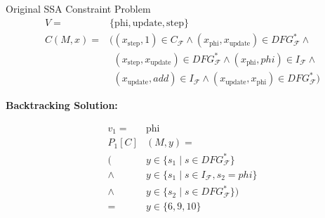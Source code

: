 \centering
\begin{blackwhitebox}{Original SSA Constraint Problem}
    \setlength{\abovedisplayskip}{0pt}
    \setlength{\belowdisplayskip}{0pt}
    \vspace{-0.5em}
    \begin{align*}
        V={}&\{\text{phi}, \text{update}, \text{step}\}\\
        C(M,x)={}&    ((x_\text{step},1)
                        \in C_\mathcal{F}\mathrel\land
                       (x_\text{phi},x_\text{update})
                        \in DFG_\mathcal{F}^*\mathrel\land\\
           &\phantom{(}(x_\text{step},x_\text{update})
                        \in DFG_\mathcal{F}^* \mathrel\land
                       (x_\text{phi}, phi)
                        \in I_\mathcal{F}\mathrel\land\\
           &\phantom{(}(x_\text{update}, add)
                        \in I_\mathcal{F}\mathrel\land
                       (x_\text{update},x_\text{phi})
                        \in DFG_\mathcal{F}^*)
    \end{align*}
\end{blackwhitebox}

\vspace{0.25cm}
{\Large\bf Backtracking Solution:}
\vspace{0.2cm}

\begin{minipage}{6cm}
    \begin{graybox}
        \footnotesize
        \setlength{\abovedisplayskip}{0pt}
        \setlength{\belowdisplayskip}{0pt}
        \vspace{-0.5em}
        \begin{align*}
            v_1={}&\text{phi}\\
            P_1[C]&(M,y)=\\
              (&y\in\{s_1\mid s\in DFG_\mathcal{F}^*\}\\
                \mathrel\land{}&y\in\{s_1\mid s\in I_\mathcal{F}, s_2=phi\}\\
                \mathrel\land{}&y\in\{s_2\mid s\in DFG_\mathcal{F}^*\})\\
               ={}&y\in\{6,9,10\}
        \end{align*}
    \end{graybox}
    \vspace{-0.75em}
    {\Huge {}}
    \hspace{1.8cm}
    {\Huge{}}
    \hspace{1.8cm}
    {\Huge{}}
\end{minipage}

